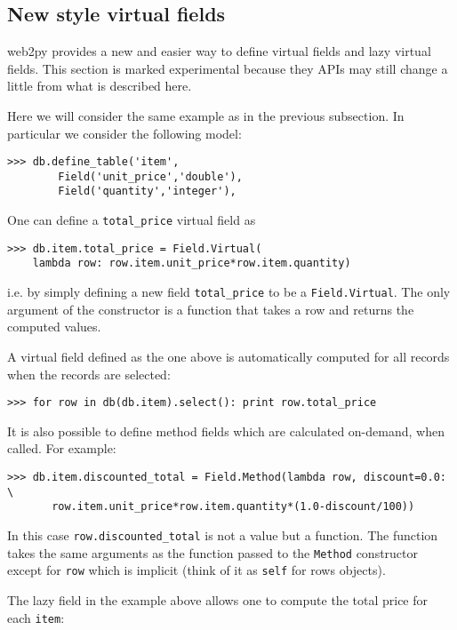 \documentclass[justified,sixbynine,notoc]{tufte-book}
\def\ft{\small\tt}
\begin{document}
\begin{fullwidth}
\goodbreak\subsection{New style virtual fields}
\noindent web2py provides a new and easier way to define virtual fields and lazy virtual fields. This section is marked experimental because they APIs may still change a little from what is described here.

Here we will consider the same example as in the previous subsection. In particular we consider the following model:

\begin{lstlisting}
>>> db.define_table('item',
        Field('unit_price','double'),
        Field('quantity','integer'),
\end{lstlisting}

One can define a {\ft total\_price} virtual field as

\begin{lstlisting}
>>> db.item.total_price = Field.Virtual(
    lambda row: row.item.unit_price*row.item.quantity)
\end{lstlisting}
\noindent i.e. by simply defining a new field {\ft total\_price} to be a {\ft Field.Virtual}. The only argument of the constructor is a function that takes a row and returns the computed values.

A virtual field defined as the one above is automatically computed for all records when the records are selected:

\begin{lstlisting}
>>> for row in db(db.item).select(): print row.total_price
\end{lstlisting}

It is also possible to define method fields which are calculated on-demand, when called.
For example:

\begin{lstlisting}
>>> db.item.discounted_total = Field.Method(lambda row, discount=0.0: \
       row.item.unit_price*row.item.quantity*(1.0-discount/100))
\end{lstlisting}

In this case {\ft row.discounted\_total} is not a value but a function. The function takes the same arguments as the function passed to the {\ft Method} constructor except for {\ft row} which is implicit (think of it as {\ft self} for rows objects).

The lazy field in the example above allows one to compute the total price for each {\ft item}:


\end{fullwidth}
\end{document}
